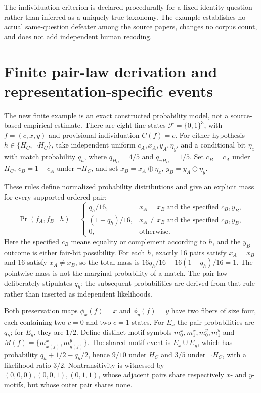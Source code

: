 \documentclass[11pt]{article}
\begin{document}
The individuation criterion is declared procedurally for a fixed identity question rather than inferred as a uniquely true taxonomy. The example establishes no actual same-question defeater among the source papers, changes no corpus count, and does not add independent human recoding.


\section{Finite pair-law derivation and representation-specific events}

The new finite example is an exact constructed probability model, not a source-based empirical estimate. There are eight fine states \(\mathcal F=\{0,1\}^3\), with \(f=(c,x,y)\) and provisional individuation \(C(f)=c\). For either hypothesis \(h\in\{H_C,\neg H_C\}\), take independent uniform \(c_A,x_A,y_A,\eta_y\), and a conditional bit \(\eta_x\) with match probability \(q_h\), where \(q_{H_C}=4/5\) and \(q_{\neg H_C}=1/5\). Set \(c_B=c_A\) under \(H_C\), \(c_B=1-c_A\) under \(\neg H_C\), and set \(x_B=x_A\oplus\eta_x\), \(y_B=y_A\oplus\eta_y\).

These rules define normalized probability distributions and give an explicit mass for every supported ordered pair:
\[
\Pr(f_A,f_B\mid h)=
\begin{cases}
q_h/16,&x_A=x_B\ \text{and the specified }c_B,y_B,\\
(1-q_h)/16,&x_A\ne x_B\ \text{and the specified }c_B,y_B,\\
0,&\text{otherwise}.
\end{cases}
\]
Here the specified \(c_B\) means equality or complement according to \(h\), and the \(y_B\) outcome is either fair-bit possibility. For each \(h\), exactly 16 pairs satisfy \(x_A=x_B\) and 16 satisfy \(x_A\ne x_B\), so the total mass is \(16q_h/16+16(1-q_h)/16=1\). The pointwise mass is not the marginal probability of a match. The pair law deliberately stipulates \(q_h\); the subsequent probabilities are derived from that rule rather than inserted as independent likelihoods.

Both preservation maps \(\phi_x(f)=x\) and \(\phi_y(f)=y\) have two fibers of size four, each containing two \(c=0\) and two \(c=1\) states. For \(E_x\) the pair probabilities are \(q_h\); for \(E_y\), they are \(1/2\). Define distinct motif symbols \(m^x_0,m^x_1,m^y_0,m^y_1\) and \(M(f)=\{m^x_{x(f)},m^y_{y(f)}\}\). The shared-motif event is \(E_x\cup E_y\), which has probability \(q_h+1/2-q_h/2\), hence \(9/10\) under \(H_C\) and \(3/5\) under \(\neg H_C\), with a likelihood ratio \(3/2\). Nontransitivity is witnessed by \((0,0,0),(0,0,1),(0,1,1)\), whose adjacent pairs share respectively \(x\)- and \(y\)-motifs, but whose outer pair shares none.
\end{document}
